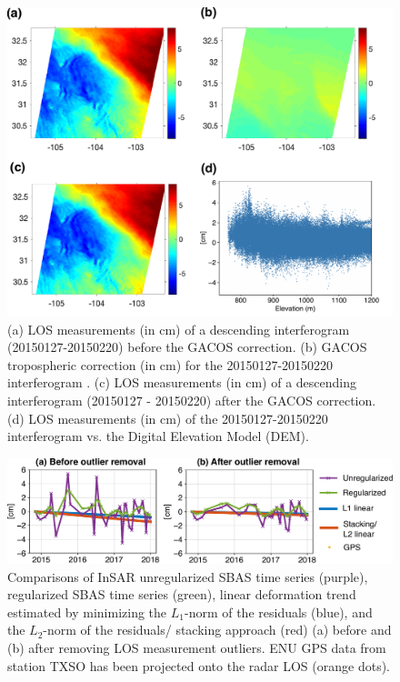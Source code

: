 \documentclass[draft,grl]{agutexSI2019}
\begin{document}
\begin{article}
\begin{figure}
\centering
\includegraphics[width=\textwidth]{figures/supplement/figureS4-gacos.pdf}		
\caption{(a) LOS measurements (in cm) of a descending interferogram (20150127-20150220) before the GACOS correction. (b) GACOS tropospheric correction (in cm) for the 20150127-20150220 interferogram \cite{yu2018interferometric}. (c) LOS measurements (in cm) of a descending interferogram (20150127 - 20150220) after the GACOS correction. (d) LOS measurements (in cm) of the 20150127-20150220 interferogram vs. the Digital Elevation Model (DEM).}
\label{fig:GACOS}
\end{figure}

\begin{figure}
\centering
\includegraphics[width=\textwidth]{figures/supplement/figureS5-compare-insar-2panel.pdf}
\caption{Comparisons of InSAR unregularized SBAS time series (purple), regularized SBAS time series (green), linear deformation trend estimated by minimizing the $L_1$-norm of the residuals (blue), and the $L_2$-norm of the residuals/ stacking approach (red)  (a) before and (b) after removing LOS measurement outliers. ENU GPS data from station TXSO has been projected onto the radar LOS (orange dots).}
\label{fig:compare}
\end{figure}


\end{article}
\end{document}
